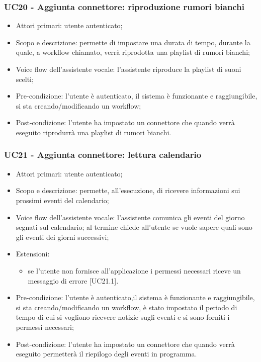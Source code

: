 \subsubsection{UC20 - Aggiunta connettore: riproduzione rumori bianchi}
\begin{itemize}
	\item  Attori primari: utente autenticato;
	\item  Scopo e descrizione: permette di impostare una durata di tempo, durante la quale, a workflow chiamato, verrà riprodotta una playlist di rumori bianchi;%
	\item  Voice flow dell'assistente vocale: l'assistente riproduce la playlist di suoni scelti;
	\item  Pre-condizione: l'utente è autenticato, il sistema è funzionante e raggiungibile, si sta creando/modificando un workflow;
	\item  Post-condizione: l'utente ha impostato un connettore che quando verrà eseguito riprodurrà una playlist di rumori bianchi.
\end{itemize}
\subsubsection{UC21 - Aggiunta connettore: lettura calendario}
\begin{itemize}
	\item  Attori primari: utente autenticato;
	\item  Scopo e descrizione: permette, all'esecuzione, di ricevere informazioni sui prossimi eventi del calendario;
	\item  Voice flow dell'assistente vocale: l'assistente comunica gli eventi del giorno segnati sul calendario; al termine chiede all'utente se vuole sapere quali sono gli eventi dei giorni successivi;
	\item  Estensioni: 
		   \begin{itemize}
				\item se l'utente non fornisce all'applicazione i permessi necessari riceve un messaggio di errore [UC21.1].
		   \end{itemize}
	\item  Pre-condizione: l'utente è autenticato,il sistema è funzionante e raggiungibile, si sta creando/modificando un workflow, è stato impostato il periodo di tempo di cui si vogliono ricevere notizie sugli eventi e si sono forniti i permessi necessari;
	\item  Post-condizione: l'utente ha impostato un connettore che quando verrà eseguito permetterà il riepilogo degli eventi in programma.
\end{itemize}
